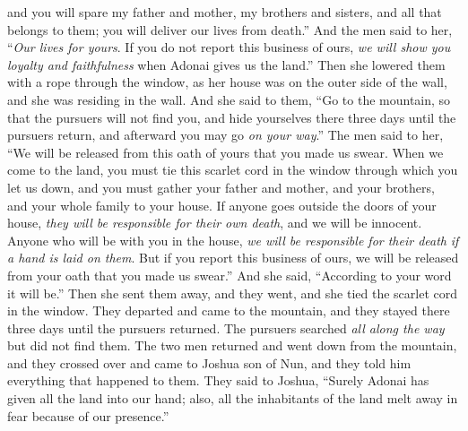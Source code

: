 \begin{biblechapter}
\verse and you will spare my father and mother, my brothers and sisters, and all that belongs to them; you will deliver our lives from death.”
\verse And the men said to her, “\textit{Our lives for yours}. If you do not report this business of ours, \textit{we will show you loyalty and faithfulness} when Adonai gives us the land.”
\verse Then she lowered them with a rope through the window, as her house was on the outer side of the wall, and she was residing in the wall.
\verse And she said to them, “Go to the mountain, so that the pursuers will not find you, and hide yourselves there three days until the pursuers return, and afterward you may go \textit{on your way}.”
\verse The men said to her, “We will be released from this oath of yours that you made us swear.
\verse When we come to the land, you must tie this scarlet cord in the window through which you let us down, and you must gather your father and mother, and your brothers, and your whole family to your house.
\verse If anyone goes outside the doors of your house, \textit{they will be responsible for their own death}, and we will be innocent. Anyone who will be with you in the house, \textit{we will be responsible for their death} \textit{if a hand is laid on them}.
\verse But if you report this business of ours, we will be released from your oath that you made us swear.”
\verse And she said, “According to your word it will be.” Then she sent them away, and they went, and she tied the scarlet cord in the window.
\verse They departed and came to the mountain, and they stayed there three days until the pursuers returned. The pursuers searched \textit{all along the way} but did not find them.
\verse The two men returned and went down from the mountain, and they crossed over and came to Joshua son of Nun, and they told him everything that happened to them.
\verse They said to Joshua, “Surely Adonai has given all the land into our hand; also, all the inhabitants of the land melt away in fear because of our presence.”
\end{biblechapter}

